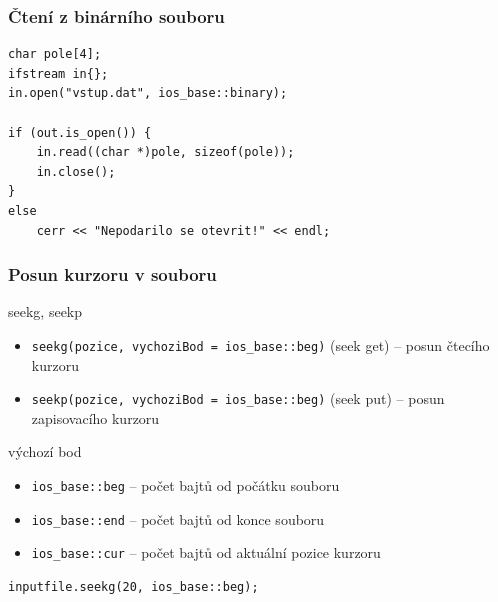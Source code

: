 \begin{frame}[fragile]
\frametitle{Čtení z binárního souboru}
\begin{yesblock}
\begin{lstlisting}
char pole[4]; 
ifstream in{}; 
in.open("vstup.dat", ios_base::binary);
 
if (out.is_open()) { 
	in.read((char *)pole, sizeof(pole));
	in.close(); 
} 
else 
	cerr << "Nepodarilo se otevrit!" << endl;
\end{lstlisting}
\end{yesblock}
\end{frame}






\begin{frame}[fragile]
\frametitle{Posun kurzoru v souboru}

\begin{block}{seekg, seekp}
\begin{itemize}
\item \lstinline|seekg(pozice, vychoziBod = ios_base::beg)| (seek get) -- posun čtecího kurzoru
\item \lstinline|seekp(pozice, vychoziBod = ios_base::beg)| (seek put) -- posun zapisovacího kurzoru
\end{itemize}
\end{block}

\begin{block}{výchozí bod}
\begin{itemize}
\item \lstinline|ios_base::beg| -- počet bajtů od počátku souboru
\item \lstinline|ios_base::end| -- počet bajtů od konce souboru
\item \lstinline|ios_base::cur| -- počet bajtů od aktuální pozice kurzoru
\end{itemize}
\end{block}

\begin{yesblock}
\begin{lstlisting}
inputfile.seekg(20, ios_base::beg);
\end{lstlisting}
\end{yesblock}
\end{frame}







